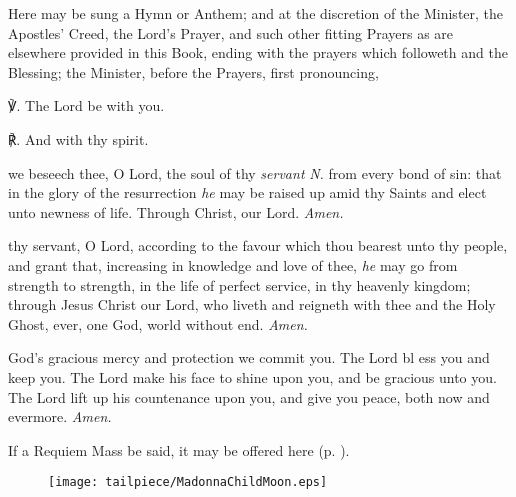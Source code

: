 \begin{rubric}
	Here may be sung a Hymn or Anthem; and at the discretion of the Minister, the Apostles' Creed, the Lord's Prayer, and such other fitting Prayers as are elsewhere provided in this Book, ending with the prayers which followeth and the Blessing; the Minister, before the Prayers, first pronouncing,
\end{rubric}

℣. The Lord be with you.

℟. And with thy spirit.

{} we beseech thee, O Lord, the soul of thy \textit{servant} \textit{N.} from every bond of sin: that in the glory of the resurrection \textit{he} may be raised up amid thy Saints and elect unto newness of life. Through Christ, our Lord. \textit{Amen.}

 thy servant, O Lord, according to the favour which thou bearest unto thy people, and grant that, increasing in knowledge and love of thee, \textit{he} may go from strength to strength, in the life of perfect service, in thy heavenly kingdom; through Jesus Christ our Lord, who liveth and reigneth with thee and the Holy Ghost, ever, one God, world without end. \textit{Amen.}

 God's gracious mercy and protection we commit you. The Lord bl {} ess you and keep you. The Lord make his face to shine upon you, and be gracious unto you. The Lord lift up his countenance upon you, and give you peace, both now and evermore. \textit{Amen.}

\begin{rubric}
    If a Requiem Mass be said, it may be offered here (p. \pageref{RequiemMasses}).
\end{rubric}

\vfill

  \begin{figure}[H]
  	\centering
  	\texttt{[image: tailpiece/MadonnaChildMoon.eps]}
  \end{figure}


\clearpage
